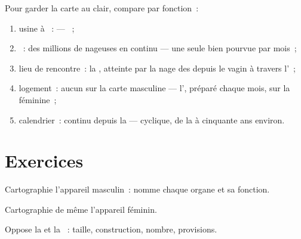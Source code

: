 \begin{method}\label{met:g8:reproductive-systems:sides}
Pour garder la carte au clair, compare par fonction~:
\begin{enumerate}
  \item usine à ~:  --- ~;
  \item {}~: des millions de nageuses en continu --- une seule
         bien pourvue par mois~;
  \item lieu de rencontre~: la , atteinte par la nage des
         depuis le vagin à travers l'~;
  \item logement~: aucun sur la carte masculine --- l',
        préparé chaque mois, sur la féminine~;
  \item calendrier~: continu depuis la  --- cyclique, de la
         à cinquante ans environ.
\end{enumerate}
\end{method}

\section{Exercices}

\begin{exercise}[$\star$]\label{exo:g8:reproductive-systems:1}
Cartographie l'appareil masculin~: nomme chaque organe et sa
fonction.
\end{exercise}

\begin{exercise}[$\star$]\label{exo:g8:reproductive-systems:2}
Cartographie de même l'appareil féminin.
\end{exercise}

\begin{exercise}[$\star$]\label{exo:g8:reproductive-systems:3}
Oppose la  et la ~: taille, construction,
nombre, provisions.
\end{exercise}

